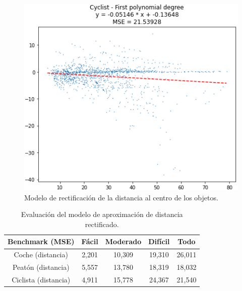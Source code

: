 \begin{figure}[H]
\begin{minipage}{0.32\textwidth}
	\end{minipage}\hfill
	\begin{minipage}{0.32\textwidth}
		\centering
		\includegraphics[width=1\linewidth]{Book/figures/6_approx_distancia/rectification_lidar_cyclist.png}
	\end{minipage}
	\caption{Modelo de rectificación de la distancia al centro de los objetos.}
	\label{fig:Modelo de rectificación de la distancia al centro de los objetos.}
\end{figure}

\begin{table}[H]
\centering
\begin{tabular}{|c|c|c|c|c|}
\hline
\textbf{Benchmark (MSE)} & \textbf{Fácil} & \textbf{Moderado} & \textbf{Difícil} & \textbf{Todo}\\ \hline \hline
Coche (distancia)        & 2,201          & 10,309             & 19,310       & 26,011     \\ \hline
Peatón (distancia)       & 5,557          & 13,780             & 18,319       & 18,032     \\ \hline
Ciclista (distancia)     & 4,911          & 15,778             & 24,367       & 21,540  \\ \hline
\end{tabular}
\caption{Evaluación del modelo de aproximación de distancia rectificado.}
\label{fig:Evaluación del modelo de aproximación de distancia rectificado.}
\end{table}

